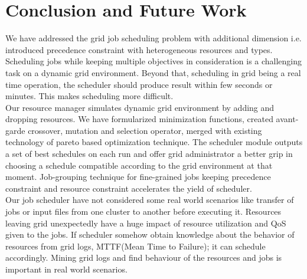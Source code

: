 \chapter{Conclusion and Future Work}
We have addressed the grid job scheduling problem with additional dimension i.e. introduced precedence constraint with heterogeneous resources and types. Scheduling jobs while keeping multiple objectives in consideration is a challenging task on a dynamic grid environment. Beyond that, scheduling in grid being a real time operation, the scheduler should produce result within few seconds or minutes. This  makes scheduling more difficult. \\
Our resource manager simulates dynamic grid environment by adding and dropping resources.  We have formularized minimization functions, created avant-garde crossover, mutation and selection operator, merged with existing technology of pareto based optimization technique. The scheduler module outputs a set of best schedules on each run and offer grid administrator a better grip in choosing a schedule compatible according to the grid environment at that moment.
Job-grouping technique for fine-grained jobs keeping precedence constraint and resource constraint accelerates the yield of scheduler. \\
Our job scheduler have not considered some real world scenarios like transfer of jobs  or input files from one cluster to another before executing it. Resources leaving grid unexpectedly have a huge impact of resource utilization and QoS given to the jobs. If scheduler somehow obtain knowledge about the behavior of resources from grid logs, MTTF(Mean Time to Failure); it can schedule accordingly. Mining grid logs and find behaviour of the resources and jobs is important in real world scenarios.